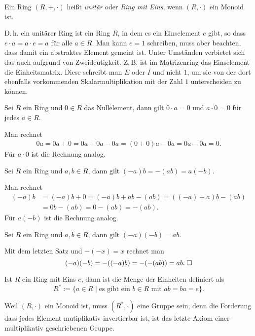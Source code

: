 \begin{Definition}%
\newlinefirst
Ein Ring $(R,+,\cdot)$ heißt \emph{unitär} oder \emph{Ring mit Eins},
wenn $(R,\cdot)$ ein Monoid ist.
\end{Definition}
D.\,h. ein unitärer Ring ist ein Ring $R$, in dem es ein Einselement
$e$ gibt, so dass $e\cdot a=a\cdot e=a$ für alle $a\in R$. Man kann
$e=1$ schreiben, muss aber beachten, dass damit ein abstraktes Element
gemeint ist. Unter Umständen verbietet sich das auch aufgrund von
Zweideutigkeit. Z.\,B. ist im Matrizenring das Einselement die
Einheitsmatrix. Diese schreibt man $E$ oder $I$ und nicht $1$, um sie
von der dort ebenfalls vorkommenden Skalarmultiplikation mit der
Zahl $1$ unterscheiden zu können.

\begin{Satz}
Sei $R$ ein Ring und $0\in R$ das Nullelement, dann gilt
$0\cdot a = 0$ und $a\cdot 0 = 0$ für jedes $a\in R$.
\end{Satz}
\begin{Beweis}
Man rechnet
\begin{align*}
0a = 0a+0 = 0a+0a-0a = (0+0)a-0a = 0a-0a = 0.
\end{align*}
Für $a\cdot 0$ ist die Rechnung analog.\;\qedsymbol
\end{Beweis}

\begin{Satz}
Sei $R$ ein Ring und $a,b\in R$, dann gilt $(-a)b = -(ab) = a(-b)$.
\end{Satz}
\begin{Beweis}
Man rechnet
\begin{align*}
(-a)b &= (-a)b+0 = (-a)b+ab-(ab) = ((-a)+a)b-(ab)\\
&= 0b-(ab) = 0-(ab) = -(ab).
\end{align*}
Für $a(-b)$ ist die Rechnung analog.\;\qedsymbol
\end{Beweis}

\begin{Satz}
Sei $R$ ein Ring und $a,b\in R$, dann gilt $(-a)(-b)=ab$.
\end{Satz}
\begin{Beweis}
Mit dem letzten Satz und $-(-x)=x$ rechnet man
\[(-a)(-b) = -((-a)b) = -(-(ab)) = ab.\;\Box\]
\end{Beweis}

\begin{Definition}[Einheitengruppe]\newlinefirst
Ist $R$ ein Ring mit Eins $e$, dann ist die Menge der Einheiten definiert als
\[R^* := \{a\in R\mid \text{es gibt ein $b\in R$ mit $ab=ba=e$}\}.\]
\end{Definition}
Weil $(R,\cdot)$ ein Monoid ist, muss $(R^*,\cdot)$ eine Gruppe sein,
denn die Forderung dass jedes Element mutiplikativ invertierbar ist,
ist das letzte Axiom einer multiplikativ geschriebenen Gruppe.

